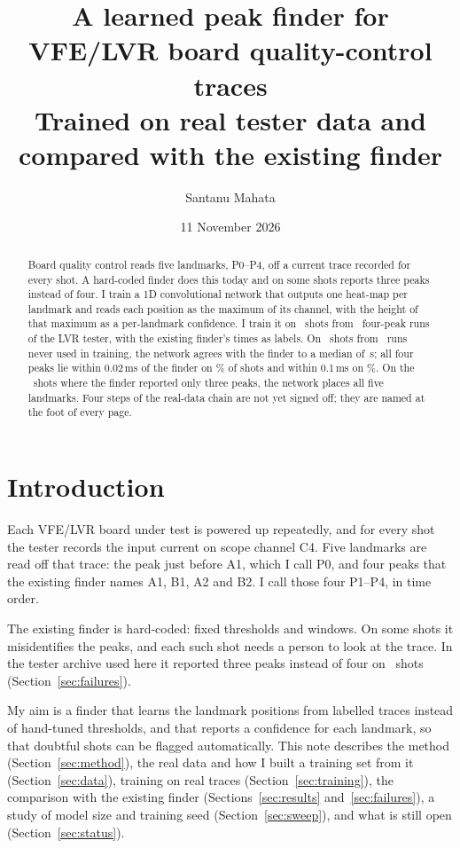 \documentclass[11pt,a4paper]{article}
\title{A learned peak finder for VFE/LVR board quality-control traces\\[4pt]
  \large Trained on real tester data and compared with the existing finder}
\author{Santanu Mahata}
\date{11 November 2026}
\newcommand{\us}{\,\textmu s}
\begin{document}
\maketitle

\begin{abstract}
Board quality control reads five landmarks, P0--P4, off a current trace recorded for every shot. A
hard-coded finder does this today and on some shots reports three peaks instead of four. I train a 1D
convolutional network that outputs one heat-map per landmark and reads each position as the maximum of
its channel, with the height of that maximum as a per-landmark confidence. I train it on \NShots\ shots from \NRuns\ four-peak runs of the LVR tester, with the existing
finder's times as labels. On \NVal\ shots from \NValRuns\ runs never used in training, the network agrees
with the finder to a median of \MedUnet\us; all four peaks lie within 0.02\,ms of the finder on \TwoUnet\%
of shots and within 0.1\,ms on \TenUnet\%. On the \NFail\ shots where the finder reported only three
peaks, the network places all five landmarks. Four steps of the real-data chain are not yet signed off;
they are named at the foot of every page.
\end{abstract}

\tableofcontents
\newpage

\section{Introduction}

Each VFE/LVR board under test is powered up repeatedly, and for every shot the tester records the input
current on scope channel C4. Five landmarks are read off that trace: the peak just before A1, which I call P0,
and four peaks that the existing finder names A1, B1, A2 and B2. I call those four P1--P4, in time order.

The existing finder is hard-coded: fixed thresholds and windows. On some shots it misidentifies the
peaks, and each such shot needs a person to look at the trace. In the tester archive used here it
reported three peaks instead of four on \NFail\ shots (Section~\ref{sec:failures}).

My aim is a finder that learns the landmark positions from labelled traces instead of hand-tuned
thresholds, and that reports a confidence for each landmark, so that doubtful shots can be flagged
automatically. This note describes the method (Section~\ref{sec:method}), the real data and how I built a training set
from it (Section~\ref{sec:data}), training on real traces (Section~\ref{sec:training}), the comparison with
the existing finder (Sections~\ref{sec:results} and~\ref{sec:failures}), a study of model size and training
seed (Section~\ref{sec:sweep}), and what is still open (Section~\ref{sec:status}).
\end{document}
